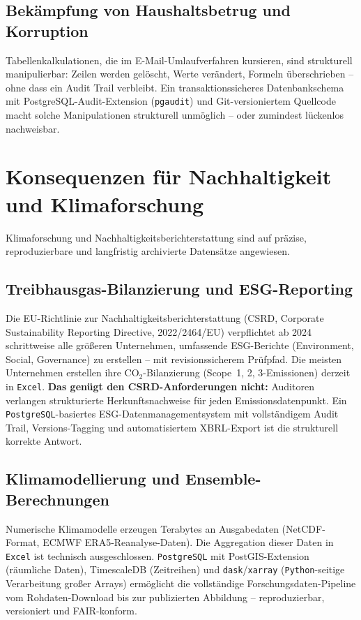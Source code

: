﻿\documentclass[12pt,a4paper]{report}
\theoremstyle{definition}
\theoremstyle{remark}
\newcommand{\excel}{\texttt{Excel}}
\newcommand{\pg}{\texttt{PostgreSQL}}
\newcommand{\py}{\texttt{Python}}
\newcommand{\code}[1]{\texttt{#1}}
\begin{document}
\subsection{Bekämpfung von Haushaltsbetrug und Korruption}

Tabellenkalkulationen, die im E-Mail-Umlaufverfahren kursieren, sind
strukturell manipulierbar: Zeilen werden gelöscht, Werte verändert,
Formeln überschrieben -- ohne dass ein Audit Trail verbleibt.
Ein transaktionssicheres Datenbankschema mit PostgreSQL-Audit-Extension
(\code{pgaudit}) und Git-versioniertem Quellcode macht solche
Manipulationen strukturell unmöglich -- oder zumindest lückenlos
nachweisbar.

\section{Konsequenzen für Nachhaltigkeit und Klimaforschung}

Klimaforschung und Nachhaltigkeitsberichterstattung sind auf präzise,
reproduzierbare und langfristig archivierte Datensätze angewiesen.

\subsection{Treibhausgas-Bilanzierung und ESG-Reporting}

Die EU-Richtlinie zur Nachhaltigkeitsberichterstattung (CSRD,
Corporate Sustainability Reporting Directive, 2022/2464/EU)
verpflichtet ab 2024 schrittweise alle größeren Unternehmen,
umfassende ESG-Berichte (Environment, Social, Governance) zu erstellen
-- mit revisionssicherem Prüfpfad.
Die meisten Unternehmen erstellen ihre CO$_2$-Bilanzierung
(Scope~1, 2, 3-Emissionen) derzeit in \excel{}.
\textbf{Das genügt den CSRD-Anforderungen nicht:}
Auditoren verlangen strukturierte Herkunftsnachweise für jeden
Emissionsdatenpunkt.
Ein \pg-basiertes ESG-Datenmanagementsystem mit vollständigem Audit
Trail, Versions-Tagging und automatisiertem XBRL-Export ist die
strukturell korrekte Antwort.

\subsection{Klimamodellierung und Ensemble-Berechnungen}

Numerische Klimamodelle erzeugen Terabytes an Ausgabedaten
(NetCDF-Format, ECMWF ERA5-Reanalyse-Daten).
Die Aggregation dieser Daten in \excel{} ist technisch ausgeschlossen.
\pg{} mit PostGIS-Extension (räumliche Daten), TimescaleDB
(Zeitreihen) und \code{dask}/\code{xarray} (\py-seitige Verarbeitung
großer Arrays) ermöglicht die vollständige Forschungsdaten-Pipeline
vom Rohdaten-Download bis zur publizierten Abbildung --
reproduzierbar, versioniert und FAIR-konform.
\end{document}
